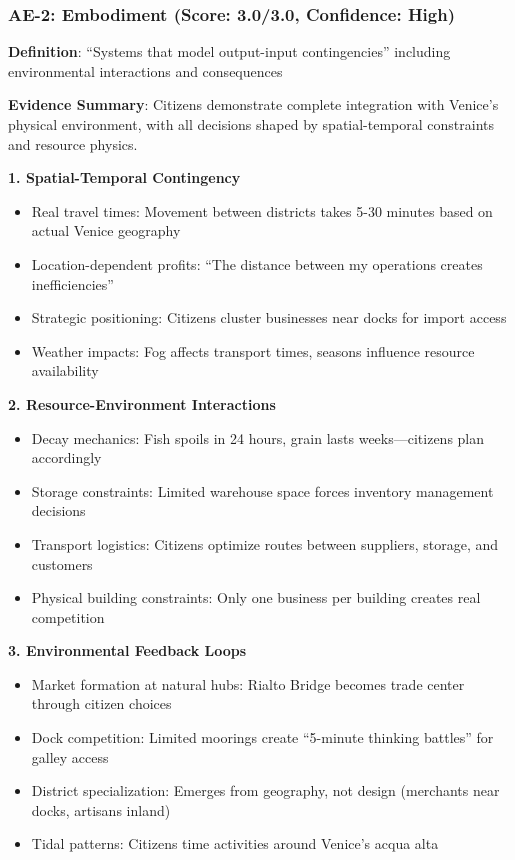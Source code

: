 \documentclass[12pt,a4paper]{article}
\begin{document}
\subsubsection{AE-2: Embodiment (Score: 3.0/3.0, Confidence: High)}

\textbf{Definition}: ``Systems that model output-input contingencies'' including environmental interactions and consequences

\textbf{Evidence Summary}: Citizens demonstrate complete integration with Venice's physical environment, with all decisions shaped by spatial-temporal constraints and resource physics.

\textbf{1. Spatial-Temporal Contingency}
\begin{itemize}
    \item Real travel times: Movement between districts takes 5-30 minutes based on actual Venice geography
    \item Location-dependent profits: ``The distance between my operations creates inefficiencies''
    \item Strategic positioning: Citizens cluster businesses near docks for import access
    \item Weather impacts: Fog affects transport times, seasons influence resource availability
\end{itemize}

\textbf{2. Resource-Environment Interactions}
\begin{itemize}
    \item Decay mechanics: Fish spoils in 24 hours, grain lasts weeks—citizens plan accordingly
    \item Storage constraints: Limited warehouse space forces inventory management decisions
    \item Transport logistics: Citizens optimize routes between suppliers, storage, and customers
    \item Physical building constraints: Only one business per building creates real competition
\end{itemize}

\textbf{3. Environmental Feedback Loops}
\begin{itemize}
    \item Market formation at natural hubs: Rialto Bridge becomes trade center through citizen choices
    \item Dock competition: Limited moorings create ``5-minute thinking battles'' for galley access
    \item District specialization: Emerges from geography, not design (merchants near docks, artisans inland)
    \item Tidal patterns: Citizens time activities around Venice's acqua alta
\end{itemize}
\end{document}
